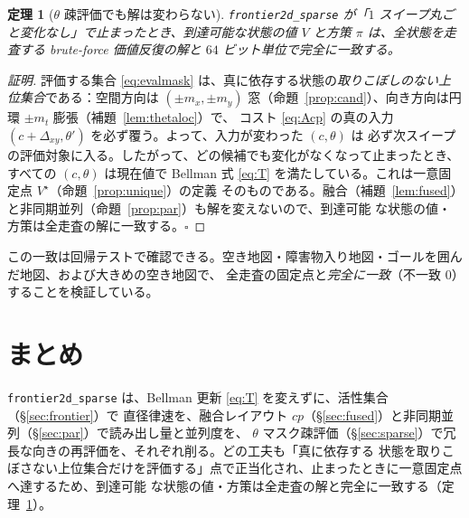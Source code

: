 \documentclass[11pt]{ltjsarticle}
\newtheorem{theorem}{定理}
\begin{document}
\begin{theorem}[$\theta$ 疎評価でも解は変わらない]
\label{thm:exact}
\texttt{frontier2d\_sparse} が「$1$ スイープ丸ごと変化なし」で止まったとき、到達可能な状態の値 $V$ と方策
$\pi$ は、全状態を走査する brute-force 価値反復の解と $64$ ビット単位で完全に一致する。
\end{theorem}

\begin{proof}[証明]
評価する集合 \eqref{eq:evalmask} は、真に依存する状態の\emph{取りこぼしのない上位集合}である：空間方向は
$(\pm m_x,\pm m_y)$ 窓（命題~\ref{prop:cand}）、向き方向は円環 $\pm m_t$ 膨張（補題~\ref{lem:thetaloc}）で、
コスト \eqref{eq:Acp} の真の入力 $(c+\Delta_{xy},\theta')$ を必ず覆う。よって、入力が変わった $(c,\theta)$ は
必ず次スイープの評価対象に入る。したがって、どの候補でも変化がなくなって止まったとき、すべての $(c,\theta)$
は現在値で Bellman 式 \eqref{eq:T} を満たしている。これは一意固定点 $V^\star$（命題~\ref{prop:unique}）の定義
そのものである。融合（補題~\ref{lem:fused}）と非同期並列（命題~\ref{prop:par}）も解を変えないので、到達可能
な状態の値・方策は全走査の解に一致する。$\square$
\end{proof}

\noindent
この一致は回帰テストで確認できる。空き地図・障害物入り地図・ゴールを囲んだ地図、および大きめの空き地図で、
全走査の固定点と\emph{完全に一致}（不一致 $0$）することを検証している。

\section{まとめ}
\texttt{frontier2d\_sparse} は、Bellman 更新 \eqref{eq:T} を変えずに、活性集合（\S\ref{sec:frontier}）で
直径律速を、融合レイアウト $cp$（\S\ref{sec:fused}）と非同期並列（\S\ref{sec:par}）で読み出し量と並列度を、
$\theta$ マスク疎評価（\S\ref{sec:sparse}）で冗長な向きの再評価を、それぞれ削る。どの工夫も「真に依存する
状態を取りこぼさない上位集合だけを評価する」点で正当化され、止まったときに一意固定点へ達するため、到達可能
な状態の値・方策は全走査の解と完全に一致する（定理~\ref{thm:exact}）。
\end{document}
